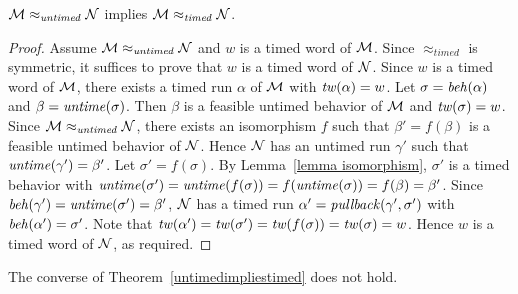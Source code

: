\begin{theorem}
\label{untimedimpliestimed}
${\mathcal M} \approx_{\mathit{untimed}} {\mathcal N}$
implies
${\mathcal M} \approx_{\mathit{timed}} {\mathcal N}$.
\end{theorem}
\iflong
\begin{proof}
Assume ${\mathcal M} \approx_{\mathit{untimed}} {\mathcal N}$ and $w$ is a timed word of ${\mathcal M}$.
Since $\approx_{\mathit{timed}}$ is symmetric, it suffices to prove that $w$ is a timed word of ${\mathcal N}$.
Since $w$ is a timed word of ${\mathcal M}$,
there exists a timed run $\alpha$ of ${\mathcal M}$ with $\mathit{tw}(\alpha) = w$. 
Let $\sigma = \mathit{beh}(\alpha)$ and $\beta = \mathit{untime}(\sigma)$. 
Then $\beta$ is a feasible untimed behavior of ${\mathcal M}$ and $\mathit{tw}(\sigma) = w$.
Since  ${\mathcal M} \approx_{\mathit{untimed}} {\mathcal N}$, there exists an isomorphism $f$ such that 
$\beta' = f(\beta)$ is a feasible untimed behavior of ${\mathcal N}$.
Hence ${\mathcal N}$ has an untimed run $\gamma'$ such that $\mathit{untime}(\gamma') = \beta'$.
Let $\sigma' = f(\sigma)$.
By Lemma~\ref{lemma isomorphism}, $\sigma'$ is a timed behavior with 
$\mathit{untime}(\sigma') = \mathit{untime}(f(\sigma)) = f(\mathit{untime}(\sigma)) = f(\beta) = \beta'$.
Since $\mathit{beh}(\gamma') = \mathit{untime}(\sigma') = \beta'$, ${\mathcal N}$ has a timed run $\alpha' = \mathit{pullback}(\gamma',\sigma')$ with
$\mathit{beh}(\alpha') = \sigma'$.
Note that $\mathit{tw}(\alpha') = \mathit{tw}(\sigma') = \mathit{tw}(f(\sigma)) = \mathit{tw}(\sigma) = w$.
Hence $w$ is a timed word of ${\mathcal N}$, as required.
\end{proof}
\fi
The converse of Theorem~\ref{untimedimpliestimed} does not hold. 
%
%
